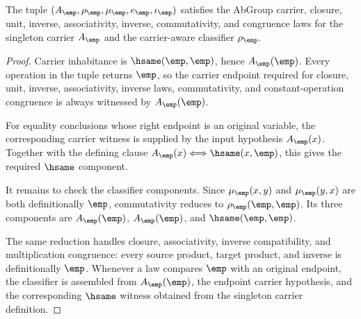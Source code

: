 \begin{theorem}
\label{thm:singleton-empty-history-abgroup-laws}
The tuple $(A_{\emp},\rho_{\emp},\mu_{\emp},e_{\emp},\iota_{\emp})$ satisfies
the AbGroup carrier, closure, unit, inverse, associativity, inverse,
commutativity, and congruence laws for the singleton carrier $A_{\emp}$ and the
carrier-aware classifier $\rho_{\emp}$.
\end{theorem}
\begin{proof}
Carrier inhabitance is $\hsame(\emp,\emp)$, hence $A_{\emp}(\emp)$.
Every operation in the tuple returns $\emp$, so the carrier endpoint required
for closure, unit, inverse, associativity, inverse laws, commutativity, and
constant-operation congruence is always witnessed by $A_{\emp}(\emp)$.

For equality conclusions whose right endpoint is an original variable, the
corresponding carrier witness is supplied by the input hypothesis
$A_{\emp}(x)$. Together with the defining clause
$A_{\emp}(x)\Longleftrightarrow\hsame(x,\emp)$, this gives the required
$\hsame$ component.

It remains to check the classifier components. Since $\mu_{\emp}(x,y)$ and
$\mu_{\emp}(y,x)$ are both definitionally $\emp$, commutativity reduces to
$\rho_{\emp}(\emp,\emp)$. Its three components are
$A_{\emp}(\emp)$, $A_{\emp}(\emp)$, and $\hsame(\emp,\emp)$.

The same reduction handles closure, associativity, inverse compatibility, and
multiplication congruence: every source product, target product, and inverse is
definitionally $\emp$. Whenever a law compares $\emp$ with an original endpoint,
the classifier is assembled from $A_{\emp}(\emp)$, the endpoint carrier
hypothesis, and the corresponding $\hsame$ witness obtained from the singleton
carrier definition.
\end{proof}

